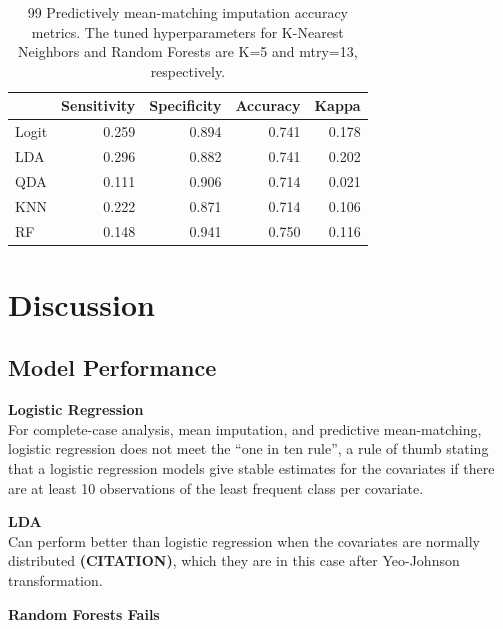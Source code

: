 \documentclass[12pt,]{article}
\begin{document}
\begin{table}[!h]

\caption{\label{tab:unnamed-chunk-6}\label{tab:pmm99-metrics} 99 Predictively mean-matching imputation accuracy metrics.  The tuned hyperparameters for K-Nearest Neighbors and Random Forests are K=5 and mtry=13, respectively.}
\centering
\fontsize{10}{12}\selectfont
\begin{tabular}{lrrrr}
\toprule
  & Sensitivity & Specificity & Accuracy & Kappa\\
\midrule
Logit & 0.259 & 0.894 & 0.741 & 0.178\\
LDA & 0.296 & 0.882 & 0.741 & 0.202\\
QDA & 0.111 & 0.906 & 0.714 & 0.021\\
KNN & 0.222 & 0.871 & 0.714 & 0.106\\
RF & 0.148 & 0.941 & 0.750 & 0.116\\
\bottomrule
\end{tabular}
\end{table}

\newpage

\section{Discussion}\label{discussion}

\subsection{Model Performance}\label{model-performance}

\textbf{Logistic Regression}\\
For complete-case analysis, mean imputation, and predictive
mean-matching, logistic regression does not meet the ``one in ten
rule'', a rule of thumb stating that a logistic regression models give
stable estimates for the covariates if there are at least 10
observations of the least frequent class per covariate.

\textbf{LDA}\\
Can perform better than logistic regression when the covariates are
normally distributed \textbf{(CITATION)}, which they are in this case
after Yeo-Johnson transformation.

\textbf{Random Forests Fails}
\end{document}
